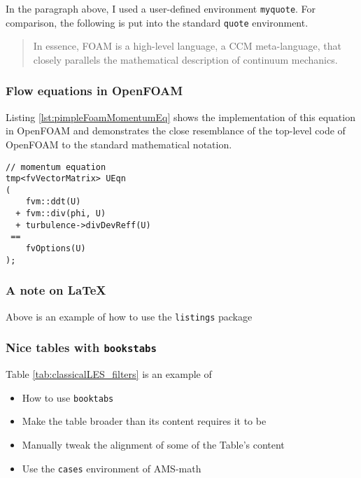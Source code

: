In the paragraph above, I used a user-defined environment \verb+myquote+. For comparison, 
the following is put into the standard \verb+quote+ environment.

\begin{quote}
In essence, \ac{FOAM} is a high-level language, a \acs{CCM} meta-language, that closely parallels 
the mathematical description of continuum mechanics.
\end{quote}





\subsubsection{Flow equations in OpenFOAM}

Listing \ref{lst:pimpleFoamMomentumEq} shows the implementation of this equation in OpenFOAM and demonstrates the 
close resemblance of the top-level code of OpenFOAM to the standard mathematical notation.

\begin{lstlisting}[escapechar=§,style=cppStyle,caption={The momentum equation of the transient incompressible 
	solver \emph{pimpleFoam}.},label=lst:pimpleFoamMomentumEq] 
// momentum equation
tmp<fvVectorMatrix> UEqn
(
    fvm::ddt(U)
  + fvm::div(phi, U)
  + turbulence->divDevReff(U)
 ==
    fvOptions(U)
);
\end{lstlisting}

\subsubsection*{A note on \LaTeX{}}

Above is an example of how to use the \verb+listings+ package





\subsubsection{Nice tables with \texttt{bookstabs}}

Table \ref{tab:classicalLES_filters} is an example of

\begin{itemize}
	\item How to use \verb+booktabs+
	\item Make the table broader than its content requires it to be
	\item Manually tweak the alignment of some of the Table's content
	\item Use the \verb+cases+ environment of AMS-math
\end{itemize}


